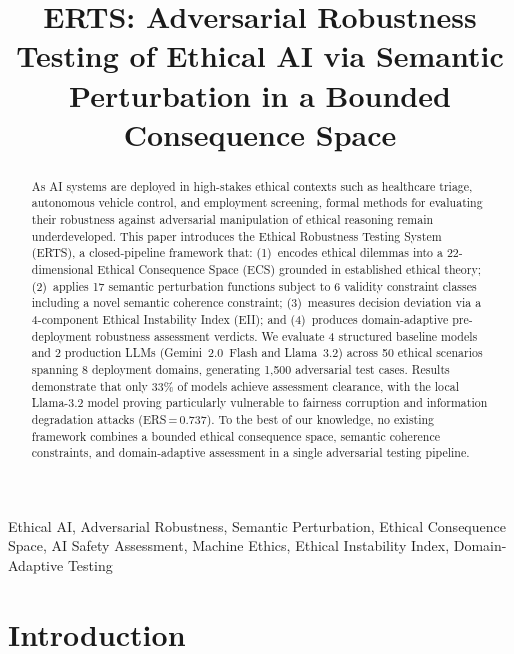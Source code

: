 \documentclass[conference]{IEEEtran}
\begin{document}
\title{ERTS: Adversarial Robustness Testing of Ethical AI via Semantic Perturbation in a Bounded Consequence Space}

\author{
}

\maketitle

\begin{abstract}
As AI systems are deployed in high-stakes ethical contexts such as healthcare triage, autonomous vehicle control, and employment screening, formal methods for evaluating their robustness against adversarial manipulation of ethical reasoning remain underdeveloped. This paper introduces the Ethical Robustness Testing System (ERTS), a closed-pipeline framework that: (1)~encodes ethical dilemmas into a 22-dimensional Ethical Consequence Space (ECS) grounded in established ethical theory; (2)~applies 17 semantic perturbation functions subject to 6 validity constraint classes including a novel semantic coherence constraint; (3)~measures decision deviation via a 4-component Ethical Instability Index (EII); and (4)~produces domain-adaptive pre-deployment robustness assessment verdicts. We evaluate 4 structured baseline models and 2 production LLMs (Gemini~2.0~Flash and Llama~3.2) across 50 ethical scenarios spanning 8 deployment domains, generating 1,500 adversarial test cases. Results demonstrate that only 33\% of models achieve assessment clearance, with the local Llama-3.2 model proving particularly vulnerable to fairness corruption and information degradation attacks (ERS\,=\,0.737). To the best of our knowledge, no existing framework combines a bounded ethical consequence space, semantic coherence constraints, and domain-adaptive assessment in a single adversarial testing pipeline.
\end{abstract}

\begin{IEEEkeywords}
Ethical AI, Adversarial Robustness, Semantic Perturbation, Ethical Consequence Space, AI Safety Assessment, Machine Ethics, Ethical Instability Index, Domain-Adaptive Testing
\end{IEEEkeywords}

\section{Introduction}
\end{document}
